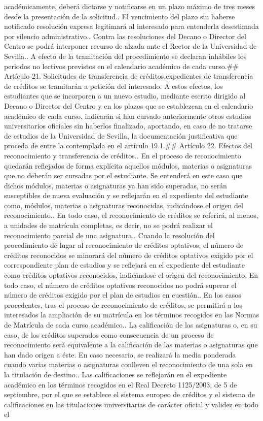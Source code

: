 \documentclass{article}
\begin{document}
\begin{itemize}
{{académicamente, deberá dictarse y notificarse en un plazo máximo de tres meses desde la presentación de la solicitud.\n{}. El vencimiento del plazo sin haberse notificado resolución expresa legitimará al interesado para entenderla desestimada por silencio administrativo.\n{}. Contra las resoluciones del Decano o Director del Centro se podrá interponer recurso de alzada ante el Rector de la Universidad de Sevilla.\n{}. A efecto de la tramitación del procedimiento se declaran inhábiles los periodos no lectivos previstos en el calendario académico de cada curso.\n\n## Artículo 21. Solicitudes de transferencia de créditos.\n\nLos expedientes de transferencia de créditos se tramitarán a petición del interesado. A estos efectos, los estudiantes que se incorporen a un nuevo estudio, mediante escrito dirigido al Decano o Director del Centro y en los plazos que se establezcan en el calendario académico de cada curso, indicarán si han cursado anteriormente otros estudios universitarios oficiales sin haberlos finalizado, aportando, en caso de no tratarse de estudios de la Universidad de Sevilla, la documentación justificativa que proceda de entre la contemplada en el artículo 19.1.\n\n## Artículo 22. Efectos del reconocimiento y transferencia de créditos.\n{}. En el proceso de reconocimiento quedarán reflejados de forma explícita aquellos módulos, materias o asignaturas que no deberán ser cursadas por el estudiante. Se entenderá en este caso que dichos módulos, materias o asignaturas ya han sido superadas, no serán susceptibles de nueva evaluación y se reflejarán en el expediente del estudiante como, módulos, materias o asignaturas reconocidas, indicándose el origen del reconocimiento.\n{}. En todo caso, el reconocimiento de créditos se referirá, al menos, a unidades de matrícula completas, es decir, no se podrá realizar el reconocimiento parcial de una asignatura.\n{}. Cuando la resolución del procedimiento dé lugar al reconocimiento de créditos optativos, el número de créditos reconocidos se minorará del número de créditos optativos exigido por el correspondiente plan de estudios y se reflejará en el expediente del estudiante como créditos optativos reconocidos, indicándose el origen del reconocimiento. En todo caso, el número de créditos optativos reconocidos no podrá superar el número de créditos exigido por el plan de estudios en cuestión.\n{}. En los casos procedentes, tras el proceso de reconocimiento de créditos, se permitirá a los interesados la ampliación de su matrícula en los términos recogidos en las Normas de Matrícula de cada curso académico.\n{}. La calificación de las asignaturas o, en su caso, de los créditos superados como consecuencia de un proceso de reconocimiento será equivalente a la calificación de las materias o asignaturas que han dado origen a éste. En caso necesario, se realizará la media ponderada cuando varias materias o asignaturas conlleven el reconocimiento de una sola en la titulación de destino.\n{}. Las calificaciones se reflejarán en el expediente académico en los términos recogidos en el Real Decreto 1125/2003, de 5 de septiembre, por el que se establece el sistema europeo de créditos y el sistema de calificaciones en las titulaciones universitarias de carácter oficial y validez en todo el }}
\end{itemize}
\end{document}
